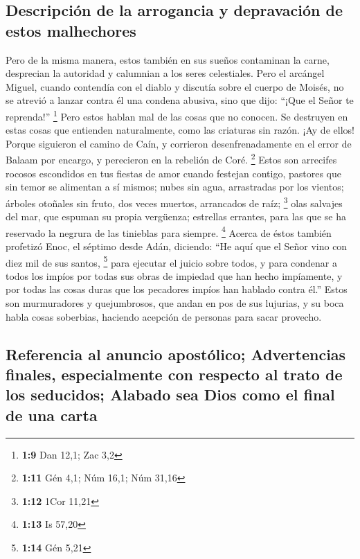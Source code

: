 \begin{paracol}{2}
\hypertarget{descripciuxf3n-de-la-arrogancia-y-depravaciuxf3n-de-estos-malhechores}{%
\subsection{Descripción de la arrogancia y depravación de estos
malhechores}\label{descripciuxf3n-de-la-arrogancia-y-depravaciuxf3n-de-estos-malhechores}}

 Pero de la misma manera, estos también en sus sueños
contaminan la carne, desprecian la autoridad y calumnian a los seres
celestiales.  Pero el arcángel Miguel, cuando contendía
con el diablo y discutía sobre el cuerpo de Moisés, no se atrevió a
lanzar contra él una condena abusiva, sino que dijo: ``¡Que el Señor te
reprenda!'' \footnote{\textbf{1:9} Dan 12,1; Zac 3,2} 
Pero estos hablan mal de las cosas que no conocen. Se destruyen en estas
cosas que entienden naturalmente, como las criaturas sin razón.
 ¡Ay de ellos! Porque siguieron el camino de Caín, y
corrieron desenfrenadamente en el error de Balaam por encargo, y
perecieron en la rebelión de Coré. \footnote{\textbf{1:11} Gén 4,1; Núm
  16,1; Núm 31,16}  Estos son arrecifes rocosos
escondidos en tus fiestas de amor cuando festejan contigo, pastores que
sin temor se alimentan a sí mismos; nubes sin agua, arrastradas por los
vientos; árboles otoñales sin fruto, dos veces muertos, arrancados de
raíz; \footnote{\textbf{1:12} 1Cor 11,21}  olas salvajes
del mar, que espuman su propia vergüenza; estrellas errantes, para las
que se ha reservado la negrura de las tinieblas para siempre.
\footnote{\textbf{1:13} Is 57,20}  Acerca de éstos
también profetizó Enoc, el séptimo desde Adán, diciendo: ``He aquí que
el Señor vino con diez mil de sus santos, \footnote{\textbf{1:14} Gén
  5,21}  para ejecutar el juicio sobre todos, y para
condenar a todos los impíos por todas sus obras de impiedad que han
hecho impíamente, y por todas las cosas duras que los pecadores impíos
han hablado contra él.''  Estos son murmuradores y
quejumbrosos, que andan en pos de sus lujurias, y su boca habla cosas
soberbias, haciendo acepción de personas para sacar provecho.

\hypertarget{referencia-al-anuncio-apostuxf3lico-advertencias-finales-especialmente-con-respecto-al-trato-de-los-seducidos-alabado-sea-dios-como-el-final-de-una-carta}{%
\subsection{Referencia al anuncio apostólico; Advertencias finales,
especialmente con respecto al trato de los seducidos; Alabado sea Dios
como el final de una
carta}\label{referencia-al-anuncio-apostuxf3lico-advertencias-finales-especialmente-con-respecto-al-trato-de-los-seducidos-alabado-sea-dios-como-el-final-de-una-carta}}


\end{paracol}
